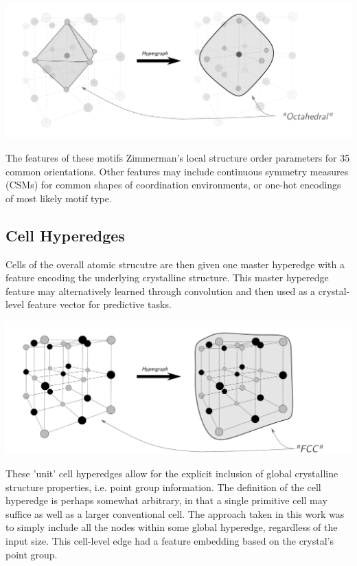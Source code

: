 \documentclass[10pt,a4paper]{article}
\begin{document}
\begin{center}
\includegraphics[scale=0.33]{motif_level_ex.pdf}
\end{center}

The features of these motifs Zimmerman's local structure order parameters for 35 common orientations. Other features may include continuous symmetry measures (CSMs) for common shapes of coordination environments, or one-hot encodings of most likely motif type. 

\subsection{Cell Hyperedges}
Cells of the overall atomic strucutre are then given one master hyperedge with a feature encoding the underlying crystalline structure. This master hyperedge feature may alternatively learned through convolution and then used as a crystal-level feature vector for predictive tasks.

\begin{center}
\includegraphics[scale=0.33]{cell_level_ex.pdf}
\end{center}
These 'unit' cell hyperedges allow for the explicit inclusion of global crystalline structure properties, i.e. point group information. The definition of the cell hyperedge is perhaps somewhat arbitrary, in that a single primitive cell may suffice as well as a larger conventional cell. The approach taken in this work was to simply include all the nodes within some global hyperedge, regardless of the input size. This cell-level edge had a feature embedding based on the crystal's point group.
\end{document}
